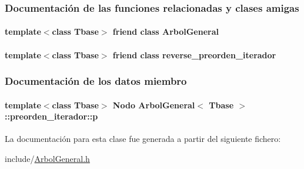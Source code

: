 \subsubsection{Documentación de las funciones relacionadas y clases amigas}
\hypertarget{classArbolGeneral_1_1preorden__iterador_a9c06e31b7c3e0d4ee5b03003d32935a5}{
\paragraph[{Arbol\-General}]{\setlength{\rightskip}{0pt plus 5cm}template$<$class Tbase$>$ friend class {\bf Arbol\-General}\hspace{0.3cm}{\ttfamily [friend]}}}\label{classArbolGeneral_1_1preorden__iterador_a9c06e31b7c3e0d4ee5b03003d32935a5}
\hypertarget{classArbolGeneral_1_1preorden__iterador_ad7df6535fb84021c7c3804850af9fdcd}{
\paragraph[{reverse\-\_\-preorden\-\_\-iterador}]{\setlength{\rightskip}{0pt plus 5cm}template$<$class Tbase$>$ friend class {\bf reverse\-\_\-preorden\-\_\-iterador}\hspace{0.3cm}{\ttfamily [friend]}}}\label{classArbolGeneral_1_1preorden__iterador_ad7df6535fb84021c7c3804850af9fdcd}


\subsubsection{Documentación de los datos miembro}
\hypertarget{classArbolGeneral_1_1preorden__iterador_afac01ba5fdc1e10c2a808d92f1dbddaf}{
\paragraph[{p}]{\setlength{\rightskip}{0pt plus 5cm}template$<$class Tbase$>$ {\bf Nodo} {\bf Arbol\-General}$<$ Tbase $>$\-::preorden\-\_\-iterador\-::p\hspace{0.3cm}{\ttfamily [private]}}}\label{classArbolGeneral_1_1preorden__iterador_afac01ba5fdc1e10c2a808d92f1dbddaf}


La documentación para esta clase fue generada a partir del siguiente fichero\-:\begin{DoxyCompactItemize}
\item 
include/\hyperlink{ArbolGeneral_8h}{Arbol\-General.\-h}\end{DoxyCompactItemize}
